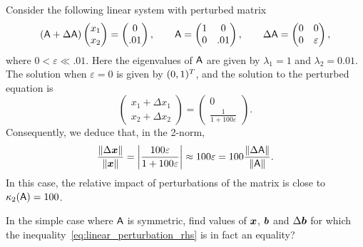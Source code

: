 \begin{example}
    Consider the following linear system
    with perturbed matrix
    \[
        (\mat A + \Delta \mat A)
        \begin{pmatrix}
            x_1 \\
            x_2
        \end{pmatrix}
        = \begin{pmatrix}
            0 \\
            .01
        \end{pmatrix},
        \qquad
        \mat A
        = \begin{pmatrix}
            1 & 0 \\
            0 & .01
        \end{pmatrix},
        \qquad
        \Delta \mat A =
        \begin{pmatrix}
            0 & 0 \\
            0 & \varepsilon
        \end{pmatrix},
    \]
    where $0 < \varepsilon \ll .01$.
    Here the eigenvalues of $\mat A$ are given by $\lambda_1 = 1$ and $\lambda_2 = 0.01$.
    The solution when $\varepsilon = 0$ is given by $(0, 1)^\t$,
    and the solution to the perturbed equation is
    \[
        \begin{pmatrix}
        x_1 + \Delta x_1 \\
        x_2 + \Delta x_2
        \end{pmatrix}
        =
        \begin{pmatrix}
            0 \\
            \frac{1}{1 + 100 \varepsilon}
        \end{pmatrix}.
    \]
    Consequently, we deduce that, in the 2-norm,
    \[
        \frac{\norm{\Delta \vect x}}{\norm{\vect x}}
        = \abs*{\frac{100 \varepsilon}{1 + 100 \varepsilon}}
        \approx 100 \varepsilon
        = 100 \frac{\norm{\Delta \mat A}}{\norm{\mat A}}.
    \]
    In this case,
    the relative impact of perturbations of the matrix is close to $\kappa_2(\mat A) = 100$.
\end{example}

\begin{exercise}
    \label{exercise:linear_sharp_inequality}
    In the simple case where $\mat A$ is symmetric,
    find values of $\vect x$, $\vect b$ and $\Delta \vect b$ for which the inequality~\eqref{eq:linear_perturbation_rhs} is in fact an equality?
\end{exercise}

